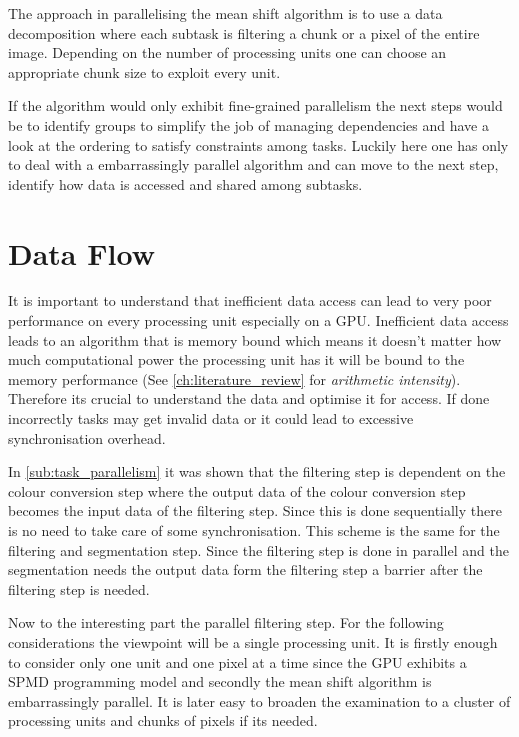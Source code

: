 The approach in parallelising the mean shift algorithm is to use a data
decomposition where each subtask is filtering a chunk or a pixel of the entire
image. Depending on the number of processing units one can choose an appropriate
chunk size to exploit every unit.

If the algorithm would only exhibit fine-grained parallelism the next steps
would be to identify groups to simplify the job of managing dependencies and
have a look at the ordering to satisfy constraints among tasks. Luckily here one
has only to deal with a embarrassingly parallel algorithm and can move to the
next step, identify how data is accessed and shared among subtasks.

\section{Data Flow} %
\label{sec:data_flow}

It is important to understand that inefficient data access can lead to very poor
performance on every processing unit especially on a \gls{GPU}. Inefficient data
access leads to an algorithm that is memory bound which means it doesn't matter
how much computational power the processing unit has it will be bound to the
memory performance (See \autoref{ch:literature_review} for \emph{arithmetic
intensity}). Therefore its crucial to understand the data and optimise it for
access. If done incorrectly tasks may get invalid data or it could lead to
excessive synchronisation overhead.

In \autoref{sub:task_parallelism} it was shown that the filtering step is
dependent on the colour conversion step where the output data of the colour
conversion step becomes the input data of the filtering step. Since this is done
sequentially there is no need to take care of some synchronisation. This scheme
is the same for the filtering and segmentation step. Since the filtering step is
done in parallel and the segmentation needs the output data form the filtering
step a barrier after the filtering step is needed.

Now to the interesting part the parallel filtering step. For the following
considerations the viewpoint will be a single processing unit. It is firstly
enough to consider only one unit and one pixel at a time since the \gls{GPU}
exhibits a \gls{SPMD} programming model and secondly the mean shift
algorithm is embarrassingly parallel. It is later easy to broaden the
examination to a cluster of processing units and chunks of pixels if its needed.

